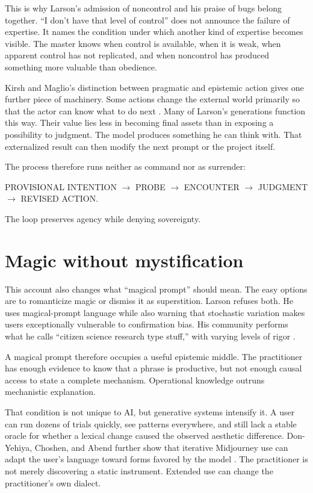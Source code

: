 \documentclass[11pt]{article}
\begin{document}
This is why Larson's admission of noncontrol and his praise of bugs belong together. ``I don't have that level of control'' does not announce the failure of expertise. It names the condition under which another kind of expertise becomes visible. The master knows when control is available, when it is weak, when apparent control has not replicated, and when noncontrol has produced something more valuable than obedience.

Kirsh and Maglio's distinction between pragmatic and epistemic action gives one further piece of machinery. Some actions change the external world primarily so that the actor can know what to do next \cite{KirshMaglio1994}. Many of Larson's generations function this way. Their value lies less in becoming final assets than in exposing a possibility to judgment. The model produces something he can think with. That externalized result can then modify the next prompt or the project itself.

The process therefore runs neither as command nor as surrender:

\begin{center}
PROVISIONAL INTENTION $\rightarrow$ PROBE $\rightarrow$ ENCOUNTER $\rightarrow$ JUDGMENT $\rightarrow$ REVISED ACTION.
\end{center}

The loop preserves agency while denying sovereignty.

\section{Magic without mystification}
This account also changes what ``magical prompt'' should mean. The easy options are to romanticize magic or dismiss it as superstition. Larson refuses both. He uses magical-prompt language while also warning that stochastic variation makes users exceptionally vulnerable to confirmation bias. His community performs what he calls ``citizen science research type stuff,'' with varying levels of rigor \cite{Larson2022}.

A magical prompt therefore occupies a useful epistemic middle. The practitioner has enough evidence to know that a phrase is productive, but not enough causal access to state a complete mechanism. Operational knowledge outruns mechanistic explanation.

That condition is not unique to AI, but generative systems intensify it. A user can run dozens of trials quickly, see patterns everywhere, and still lack a stable oracle for whether a lexical change caused the observed aesthetic difference. Don-Yehiya, Choshen, and Abend further show that iterative Midjourney use can adapt the user's language toward forms favored by the model \cite{DonYehiyaChoshenAbend2023}. The practitioner is not merely discovering a static instrument. Extended use can change the practitioner's own dialect.
\end{document}
